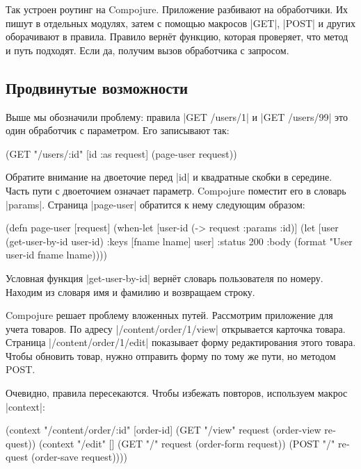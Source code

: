 Так устроен роутинг на Compojure. Приложение разбивают на обработчики.  Их пишут
в отдельных модулях, затем с помощью макросов \spverb|GET|, \spverb|POST| и
других оборачивают в правила. Правило верн\"{е}т функцию, которая проверяет, что
метод и путь подходят. Если да, получим вызов обработчика с запросом.

\subsection{Продвинутые возможности}

Выше мы обозначили проблему: правила \spverb|GET /users/1|
и \spverb|GET /users/99| это один обработчик с параметром. Его записывают так:

\begin{english}
  \begin{clojure}
(GET "/users/:id" [id :as request] (page-user request))
  \end{clojure}
\end{english}

Обратите внимание на двоеточие перед \spverb|id| и квадратные скобки в середине.
Часть пути с двоеточием означает параметр. Compojure поместит его в словарь
\spverb|params|. Страница \spverb|page-user| обратится к нему следующим образом:

\begin{english}
  \begin{clojure}
(defn page-user [request]
  (when-let [user-id (-> request :params :id)]
    (let [user (get-user-by-id user-id)
          {:keys [fname lname]} user]
      {:status 200
       :body (format "User %
                     user-id fname lname)})))
  \end{clojure}
\end{english}

Условная функция \spverb|get-user-by-id| верн\"{е}т словарь пользователя по
номеру. Находим из словаря имя и фамилию и возвращаем строку.

Compojure решает проблему вложенных путей. Рассмотрим приложение для учета
товаров. По адресу \spverb|/content/order/1/view| открывается карточка
товара. Страница \spverb|/content/order/1/edit| показывает форму редактирования
этого товара. Чтобы обновить товар, нужно отправить форму по тому же пути, но
методом POST.

Очевидно, правила пересекаются. Чтобы избежать повторов, используем макрос
\spverb|context|:

\begin{english}
  \begin{clojure}
(context "/content/order/:id" [order-id]
  (GET  "/view" request (order-view request))
  (context "/edit" []
    (GET  "/" request (order-form request))
    (POST "/" request (order-save request))))
  \end{clojure}
\end{english}

